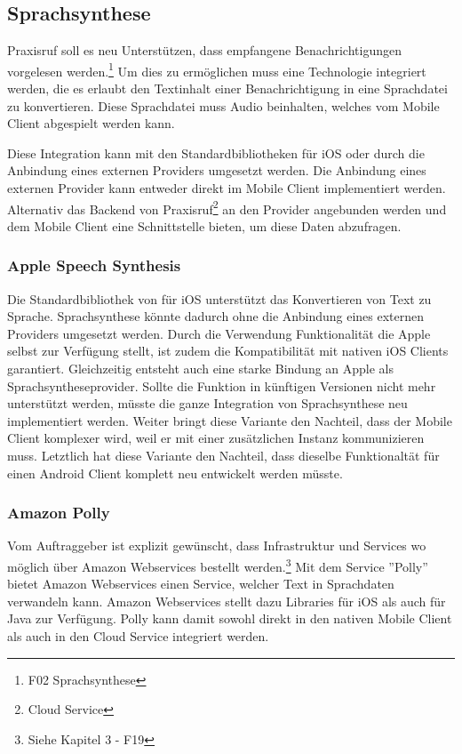 \subsection{Sprachsynthese}

Praxisruf soll es neu Unterstützen, dass empfangene Benachrichtigungen vorgelesen werden.\footnote{F02 Sprachsynthese}
Um dies zu ermöglichen muss eine Technologie integriert werden, die es erlaubt den Textinhalt einer Benachrichtigung in eine Sprachdatei zu konvertieren.
Diese Sprachdatei muss Audio beinhalten, welches vom Mobile Client abgespielt werden kann.

Diese Integration kann mit den Standardbibliotheken für iOS oder durch die Anbindung eines externen Providers umgesetzt werden.
Die Anbindung eines externen Provider kann entweder direkt im Mobile Client implementiert werden.
Alternativ das Backend von Praxisruf\footnote{Cloud Service} an den Provider angebunden werden und dem Mobile Client eine Schnittstelle bieten, um diese Daten abzufragen.

\subsubsection*{Apple Speech Synthesis}

Die Standardbibliothek von für iOS unterstützt das Konvertieren von Text zu Sprache.\cite{ios_speech_synthesis}
Sprachsynthese könnte dadurch ohne die Anbindung eines externen Providers umgesetzt werden.
Durch die Verwendung Funktionalität die Apple selbst zur Verfügung stellt, ist zudem die Kompatibilität mit nativen iOS Clients garantiert.
Gleichzeitig entsteht auch eine starke Bindung an Apple als Sprachsyntheseprovider.
Sollte die Funktion in künftigen Versionen nicht mehr unterstützt werden, müsste die ganze Integration von Sprachsynthese neu implementiert werden.
Weiter bringt diese Variante den Nachteil, dass der Mobile Client komplexer wird, weil er mit einer zusätzlichen Instanz kommunizieren muss.
Letztlich hat diese Variante den Nachteil, dass dieselbe Funktionaltät für einen Android Client komplett neu entwickelt werden müsste.

\subsubsection*{Amazon Polly}

Vom Auftraggeber ist explizit gewünscht, dass Infrastruktur und Services wo möglich über Amazon Webservices bestellt werden.\footnote{Siehe Kapitel 3 - F19}
Mit dem Service ''Polly'' bietet Amazon Webservices einen Service, welcher Text in Sprachdaten verwandeln kann.\cite{aws_polly}
Amazon Webservices stellt dazu Libraries für iOS\cite{aws_polly_ios} als auch für Java zur Verfügung\cite{aws_polly_java}.
Polly kann damit sowohl direkt in den nativen Mobile Client als auch in den Cloud Service integriert werden.

